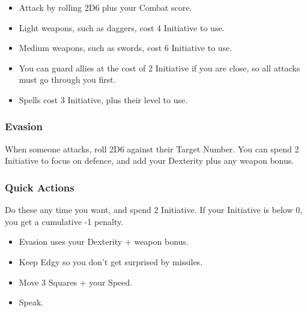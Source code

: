 \begin{multicols}{2}
\begin{itemize}

	\item{Attack by rolling 2D6 plus your Combat score.}
	\item{Light weapons, such as daggers, cost 4 Initiative to use.}
	\item{Medium weapons, such as swords, cost 6 Initiative to use.}
	\item{You can guard allies at the cost of 2 Initiative if you are close, so all attacks must go through you first.}
	\item{Spells cost 3 Initiative, plus their level to use.}

\end{itemize}

\subsubsection{Evasion}

When someone attacks, roll 2D6 against their Target Number.
You can spend 2 Initiative to focus on defence, and add your Dexterity plus any weapon bonus.

\subsubsection{Quick Actions}

Do these any time you want, and spend 2 Initiative.
If your Initiative is below 0, you get a cumulative -1 penalty.

\begin{itemize}

	\item{Evasion uses your Dexterity + weapon bonus.}
	\item{Keep Edgy so you don't get surprised by missiles.}
	\item{Move 3 Squares + your Speed.}
	\item{Speak.}

\end{itemize}

\end{multicols}
